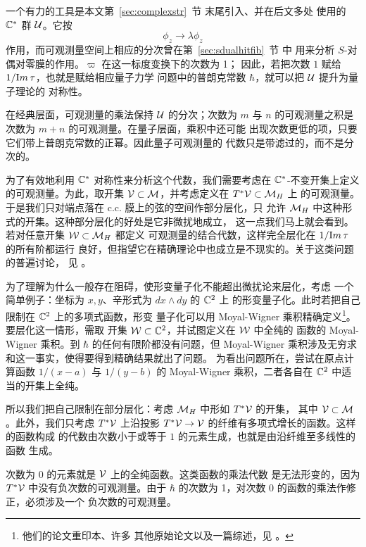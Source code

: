 一个有力的工具是本文第~\ref{sec:complexstr}~节 末尾引入、并在后文多处
使用的 $\CC^*$ 群 ${\cal U}$。它按 %
\setcounter{equation}{10}
\begin{equation}\label{eq:utyp}
\phi_z\to \lambda
\phi_z
\end{equation}
 作用，而可观测量空间上相应的分次曾在第~\ref{sec:sdualhitfib}~节 中
用来分析 $S$-对偶对零膜的作用。$\varpi$ 在这一标度变换下的次数为 1；
因此，若把次数 $1$ 赋给 ${1/{\rm Im}\,\tau}$，也就是赋给相应量子力学
问题中的普朗克常数 $\hbar$，就可以把 ${\cal U}$ 提升为量子理论的
对称性。

在经典层面，可观测量的乘法保持 ${\cal U}$ 的分次；次数为 $m$ 与 $n$
的可观测量之积是次数为 $m+n$ 的可观测量。在量子层面，乘积中还可能
出现次数更低的项，只要它们带上普朗克常数的正幂。因此量子可观测量的
代数只是带滤过的，而不是分次的。

为了有效地利用 $\Bbb{C}^*$ 对称性来分析这个代数，我们需要考虑在
$\Bbb{C}^*$-不变开集上定义的可观测量。为此，取开集
${{\cal V}}\subset {\EUM}$，并考虑定义在 $T^*{{\cal V}}\subset \MH$ 上
的可观测量。于是我们只对端点落在 c.c. 膜上的弦的空间作部分层化，只
允许 $\MH$ 中这种形式的开集。这种部分层化的好处是它非微扰地成立，
这一点我们马上就会看到。若对任意开集 ${\cal W}\subset \MH$ 都定义
可观测量的结合代数，这样完全层化在 $1/{\rm Im}\,\tau$ 的所有阶都运行
良好，但指望它在精确理论中也成立是不现实的。关于这类问题的普遍讨论，
见 \cite{ref138}。

为了理解为什么一般存在阻碍，使形变量子化不能超出微扰论来层化，考虑
一个简单例子：坐标为 $x,y$、辛形式为 $dx\wedge dy$ 的 $\Bbb{C}^{2}$ 上
的形变量子化。此时若把自己限制在 $\Bbb{C}^{2}$ 上的多项式函数，形变
量子化可以用 Moyal-Wigner 乘积精确定义\footnote{他们的论文重印本、许多
其他原始论文以及一篇综述，见 \cite{ref139}。}。要层化这一情形，需取
开集 ${\cal W}\subset\Bbb{C}^{2}$，并试图定义在 ${\cal W}$ 中全纯的
函数的 Moyal-Wigner 乘积。到 $\hbar$ 的任何有限阶都没有问题，但
Moyal-Wigner 乘积涉及无穷求和这一事实，使得要得到精确结果就出了问题。
为看出问题所在，尝试在原点计算函数 $1/(x-a)$ 与 $1/(y-b)$ 的
Moyal-Wigner 乘积，二者各自在 $\Bbb{C}^2$ 中适当的开集上全纯。

所以我们把自己限制在部分层化：考虑 $\MH$ 中形如 $T^*{{\cal V}}$ 的开集，
其中 ${{\cal V}}\subset\M$。此外，我们只考虑 $T^*{{\cal V}}$ 上沿投影
$T^*{{\cal V}}\to{{\cal V}}$ 的纤维有多项式增长的函数。这样的函数构成
的代数由次数小于或等于 $1$ 的元素生成，也就是由沿纤维至多线性的函数
生成。

次数为 $0$ 的元素就是 ${{\cal V}}$ 上的全纯函数。这类函数的乘法代数
是无法形变的，因为 $T^*{{\cal V}}$ 中没有负次数的可观测量。由于
$\hbar$ 的次数为 1，对次数 $0$ 的函数的乘法作修正，必须涉及一个
负次数的可观测量。

